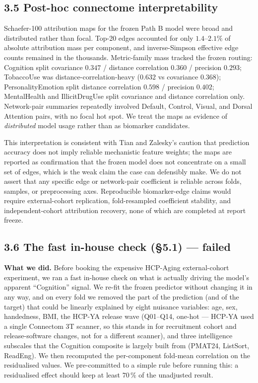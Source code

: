 \documentclass[11pt,letterpaper]{report}
\begin{document}
\subsection*{3.5 Post-hoc connectome interpretability}

Schaefer-100 attribution maps for the frozen Path B model were broad and distributed rather than focal. Top-20 edges accounted for only $1.4$--$2.1\%$ of absolute attribution mass per component, and inverse-Simpson effective edge counts remained in the thousands. Metric-family mass tracked the frozen routing: Cognition split covariance $0.347$ / distance correlation $0.360$ / precision $0.293$; TobaccoUse was distance-correlation-heavy ($0.632$ vs covariance $0.368$); PersonalityEmotion split distance correlation $0.598$ / precision $0.402$; MentalHealth and IllicitDrugUse split covariance and distance correlation only. Network-pair summaries repeatedly involved Default, Control, Visual, and Dorsal Attention pairs, with no focal hot spot. We treat the maps as evidence of \emph{distributed} model usage rather than as biomarker candidates.

This interpretation is consistent with Tian and Zalesky's caution that prediction accuracy does not imply reliable mechanistic feature weights; the maps are reported as confirmation that the frozen model does not concentrate on a small set of edges, which is the weak claim the case can defensibly make. We do not assert that any specific edge or network-pair coefficient is reliable across folds, samples, or preprocessing axes. Reproducible biomarker-edge claims would require external-cohort replication, fold-resampled coefficient stability, and independent-cohort attribution recovery, none of which are completed at report freeze.

\subsection*{3.6 The fast in-house check (\S5.1) --- failed}

\textbf{What we did.} Before booking the expensive HCP-Aging external-cohort experiment, we ran a fast in-house check on what is actually driving the model's apparent ``Cognition'' signal. We re-fit the frozen predictor without changing it in any way, and on every fold we removed the part of the prediction (and of the target) that could be linearly explained by eight nuisance variables: age, sex, handedness, BMI, the HCP-YA release wave (Q01--Q14, one-hot --- HCP-YA used a single Connectom 3T scanner, so this stands in for recruitment cohort and release-software changes, not for a different scanner), and three intelligence subscales that the Cognition composite is largely built from (PMAT24, ListSort, ReadEng). We then recomputed the per-component fold-mean correlation on the residualised values. We pre-committed to a simple rule before running this: a residualised effect should keep at least $70\,\%$ of the unadjusted result.
\end{document}
